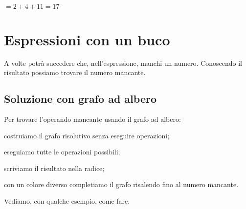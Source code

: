 $= 2 + 4 + 11 = 17$

\section{Espressioni con un buco}
\label{sec:01_espressioni_buco}

A volte potrà succedere che, nell'espressione, manchi un numero.
Conoscendo il risultato possiamo trovare il numero mancante.

\subsection{Soluzione con grafo ad albero}

\begin{procedura}
 Per trovare l'operando mancante usando il grafo ad albero:
\begin{enumerate*}
 \item costruiamo il grafo risolutivo senza eseguire operazioni;
 \item eseguiamo tutte le operazioni possibili;
 \item scriviamo il risultato nella radice;
 \item con un colore diverso completiamo il grafo risalendo fino al numero 
  mancante.
\end{enumerate*}
\end{procedura}

Vediamo, con qualche esempio, come fare.

